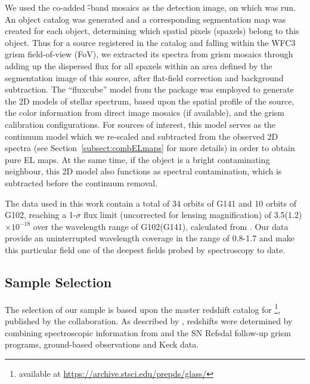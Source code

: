 We used the co-added \H-band mosaics as the detection image, on which \sex
was run. An object catalog was generated and a
corresponding segmentation map was created for each object,
determining which spatial pixels (spaxels) belong to this object. Thus for a source
registered in the catalog and falling within the WFC3 grism field-of-view (FoV), we
extracted its spectra from grism mosaics through adding up the
dispersed flux for all spaxels within an area defined by the
segmentation image of this source, after flat-field correction and
background subtraction.  The ``fluxcube'' model from the \axe package
\citep{Kummel:2009dn} was employed to generate the 2D models of stellar
spectrum, based upon the spatial profile of the source, the color
information from direct image mosaics (if available), and the grism
calibration configurations.  For sources of interest, this model
serves as the continuum model which we re-scaled and subtracted from
the observed 2D spectra (see Section~\ref{subsect:combELmaps} for more
details) in order to obtain pure EL maps. At the same time, if the object is a bright contaminating neighbour,
this 2D model also functions as spectral contamination, which is subtracted before the continuum removal.

The data used in this work contain a total of 34 orbits of G141 and 10 orbits of G102,
reaching a 1-$\sigma$ flux limit (uncorrected for lensing magnification) of 3.5(1.2)$\times$$10^{-18}$ \Funit over the wavelength
range of G102(G141), calculated from \citet{Schmidt:2016ez}. Our data provide an uninterrupted wavelength coverage in the range of
0.8-1.7 \micron and make this particular field one of the deepest fields probed by \hst spectroscopy to date.

\subsection{Sample Selection}\label{subsect:srcselect}

\begin{landscape}

\end{landscape}

The selection of our \mg sample is based upon the master redshift
catalog for \clyi\footnote{available at \url{https://archive.stsci.edu/prepds/glass/}}, published by the \glass collaboration.
As described by \citet{2015arXiv151005750T}, redshifts were determined by combining
spectroscopic information from \glass and the SN Refsdal follow-up \hst
grism programs, ground-based \muse observations and Keck \deimos data.

